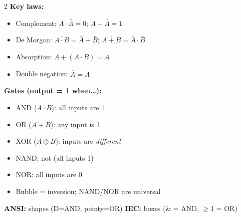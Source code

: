 \documentclass[11pt, letterpaper]{article}
\begin{document}
\vspace{4pt}

\begin{tcolorbox}[colback=part4bg, colframe=sectionorange,
  title={\bfseries Boolean Algebra \& Logic Gates}, arc=3pt, boxrule=1pt]
\footnotesize
\begin{multicols}{2}
\textbf{Key laws:}
\begin{itemize}[noitemsep, leftmargin=*]
  \item Complement: $A\cdot\bar{A}=0$; $A+\bar{A}=1$
  \item De Morgan: $\overline{A\cdot B}=\bar{A}+\bar{B}$; $\overline{A+B}=\bar{A}\cdot\bar{B}$
  \item Absorption: $A+(A\cdot B)=A$
  \item Double negation: $\overline{\overline{A}}=A$
\end{itemize}
\columnbreak
\textbf{Gates (output = 1 when\ldots):}
\begin{itemize}[noitemsep, leftmargin=*]
  \item AND ($A\cdot B$): all inputs are 1
  \item OR ($A+B$): any input is 1
  \item XOR ($A\oplus B$): inputs are \emph{different}
  \item NAND: not (all inputs 1)
  \item NOR: all inputs are 0
  \item Bubble = inversion; NAND/NOR are universal
\end{itemize}
\end{multicols}
\textbf{ANSI:} shapes (D=AND, pointy=OR) \quad \textbf{IEC:} boxes (\& = AND, $\geq$1 = OR)
\end{tcolorbox}

\vspace{4pt}
\end{document}
